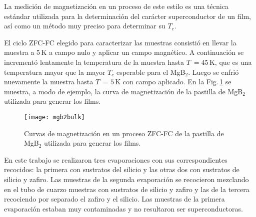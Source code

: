La medición de magnetización en un proceso de este estilo es una técnica estándar utilizada para la determinación del carácter superconductor de un film, así como un método muy preciso para determinar su $T_{c}$.

El ciclo ZFC-FC elegido para caracterizar las muestras consistió en llevar la muestra a 5\,K a campo nulo y aplicar un campo magnético. A continuación se incrementó lentamente la temperatura de la muestra hasta $T \ = 45$\,K, que es una temperatura mayor que la mayor $T_c$ esperable para el MgB$_2$. Luego se enfrió nuevamente la muestra hasta $T\ = 5$\,K con campo aplicado. En la Fig.\,\ref{fig:bulk} se muestra, a modo de ejemplo, la curva de magnetización de la pastilla de MgB$_2$ utilizada para generar los films.
\begin{figure}[tbh!]
 \begin{center}
    \texttt{[image: mgb2bulk]}
  \end{center}
\caption{Curvas de magnetización en un proceso ZFC-FC de la pastilla de MgB$_2$ utilizada para generar los films.}
\label{fig:bulk}
\end{figure}
En este trabajo se realizaron tres evaporaciones con sus correspondientes recocidos: la primera con sustratos del silicio y las otras dos con sustratos de silicio y zafiro. Las muestras de la segunda evaporación se recocieron mezclando en el tubo de cuarzo muestras con sustratos de silicio y zafiro y las de la tercera recociendo por separado el zafiro y el silicio. Las muestras de la primera evaporación estaban muy contaminadas y no resultaron ser superconductoras.

